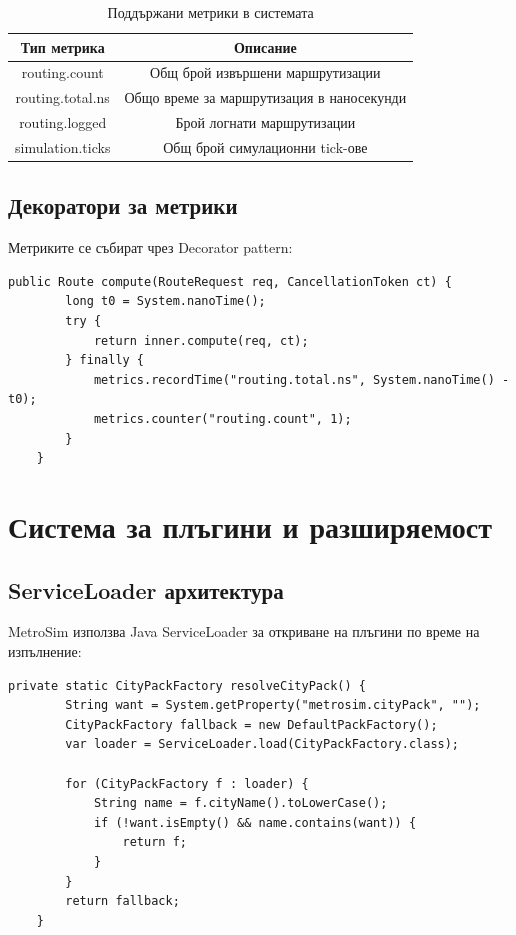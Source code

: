 \documentclass{article}
\begin{document}
\begin{table}[H]
	\centering
	\begin{tabular}{|c|c|}
		\hline
		\textbf{Тип метрика} & \textbf{Описание} \\
		\hline
		routing.count & Общ брой извършени маршрутизации \\
		\hline
		routing.total.ns & Общо време за маршрутизация в наносекунди \\
		\hline
		routing.logged & Брой логнати маршрутизации \\
		\hline
		simulation.ticks & Общ брой симулационни tick-ове \\
		\hline
	\end{tabular}
	\caption{Поддържани метрики в системата}
\end{table}

\subsection{Декоратори за метрики}

Метриките се събират чрез Decorator pattern:

\begin{lstlisting}[caption=MeteredRouter декоратор]
	public Route compute(RouteRequest req, CancellationToken ct) {
		long t0 = System.nanoTime();
		try {
			return inner.compute(req, ct);
		} finally {
			metrics.recordTime("routing.total.ns", System.nanoTime() - t0);
			metrics.counter("routing.count", 1);
		}
	}
\end{lstlisting}

\section{Система за плъгини и разширяемост}

\subsection{ServiceLoader архитектура}

MetroSim използва Java ServiceLoader за откриване на плъгини по време на изпълнение:

\begin{lstlisting}[caption=Плъгин discovery в Bootstrap]
	private static CityPackFactory resolveCityPack() {
		String want = System.getProperty("metrosim.cityPack", "");
		CityPackFactory fallback = new DefaultPackFactory();
		var loader = ServiceLoader.load(CityPackFactory.class);
		
		for (CityPackFactory f : loader) {
			String name = f.cityName().toLowerCase();
			if (!want.isEmpty() && name.contains(want)) {
				return f;
			}
		}
		return fallback;
	}
\end{lstlisting}
\end{document}
